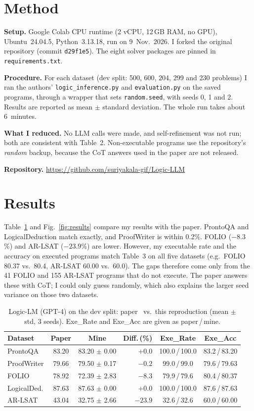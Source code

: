 \documentclass[conference]{IEEEtran}
\begin{document}
\section{Method}
\textbf{Setup.} Google Colab CPU runtime (2 vCPU, 12\,GB RAM, no GPU),
Ubuntu~24.04.5, Python~3.13.18, run on 9~Nov.~2026. I forked the original
repository (commit \texttt{d29f1e5}). The eight solver packages are pinned in
\texttt{requirements.txt}.

\textbf{Procedure.} For each dataset (dev split: 500, 600, 204, 299 and 230
problems) I ran the authors' \texttt{logic\_inference.py} and
\texttt{evaluation.py} on the saved programs, through a wrapper that sets
\texttt{random.seed}, with seeds 0, 1 and 2. Results are reported as mean
$\pm$ standard deviation. The whole run takes about 6~minutes.

\textbf{What I reduced.} No LLM calls were made, and self-refinement was not
run; both are consistent with Table~2. Non-executable programs use the
repository's \emph{random} backup, because the CoT answers used in the paper
are not released.

\textbf{Repository.} \url{https://github.com/suriyakala-gif/Logic-LLM}

\section{Results}
Table~\ref{tab:results} and Fig.~\ref{fig:results} compare my results with the
paper. ProntoQA and LogicalDeduction match exactly, and ProofWriter is within
0.2\%. FOLIO ($-8.3$\%) and AR-LSAT ($-23.9$\%) are lower. However, my
executable rate and the accuracy on executed programs match Table~3 on all
five datasets (e.g.\ FOLIO 80.37 vs.\ 80.4, AR-LSAT 60.00 vs.\ 60.0). The
gaps therefore come only from the 41 FOLIO and 155 AR-LSAT programs that do
not execute. The paper answers these with CoT; I could only guess randomly,
which also explains the larger seed variance on those two datasets.

\begin{table}[t]
\caption{Logic-LM (GPT-4) on the dev split: paper~\cite{pan2023logiclm}
vs.\ this reproduction (mean $\pm$ std, 3 seeds). Exe\_Rate and Exe\_Acc are
given as paper\,/\,mine.}
\label{tab:results}
\centering\footnotesize
\setlength{\tabcolsep}{2.5pt}
\begin{tabular}{lccrcc}
\hline
Dataset & Paper & Mine & Diff.\,(\%) & Exe\_Rate & Exe\_Acc \\
\hline
ProntoQA     & 83.20 & 83.20 $\pm$ 0.00 & $+0.0$  & 100.0\,/\,100.0 & 83.2\,/\,83.20 \\
ProofWriter  & 79.66 & 79.50 $\pm$ 0.17 & $-0.2$  & 99.0\,/\,99.0   & 79.6\,/\,79.63 \\
FOLIO        & 78.92 & 72.39 $\pm$ 2.83 & $-8.3$  & 79.9\,/\,79.6   & 80.4\,/\,80.37 \\
LogicalDed.  & 87.63 & 87.63 $\pm$ 0.00 & $+0.0$  & 100.0\,/\,100.0 & 87.6\,/\,87.63 \\
AR-LSAT      & 43.04 & 32.75 $\pm$ 2.66 & $-23.9$ & 32.6\,/\,32.6   & 60.0\,/\,60.00 \\
\hline
\end{tabular}
\end{table}
\end{document}
